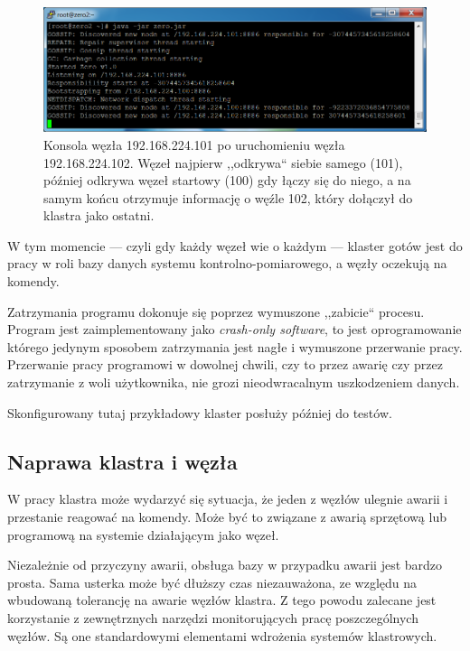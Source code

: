 \documentclass[a4paper,polish,12pt,twoside]{article}
\begin{document}
	\begin{figure}[h]
		\centering \includegraphics[width=15cm]{after_101_start}
		\caption[Zrzut ekranu konsoli węzła]{Konsola węzła 192.168.224.101 po uruchomieniu węzła 192.168.224.102. Węzeł najpierw ,,odkrywa`` siebie samego (101), później odkrywa węzeł startowy (100) gdy łączy się do niego, a na samym końcu otrzymuje informację o węźle 102, który dołączył do klastra jako ostatni.}
		\label{fig:after_101_start}
	\end{figure}

W tym momencie --- czyli gdy każdy węzeł wie o każdym --- klaster gotów jest do pracy w roli bazy danych systemu kontrolno-pomiarowego, a węzły oczekują na komendy.

Zatrzymania programu dokonuje się poprzez wymuszone ,,zabicie`` procesu. Program jest zaimplementowany jako \textit{crash-only software}\cite{Candea:2003}, to jest oprogramowanie którego jedynym sposobem zatrzymania jest nagłe i wymuszone przerwanie pracy. Przerwanie pracy programowi w dowolnej chwili, czy to przez awarię czy przez zatrzymanie z woli użytkownika, nie grozi nieodwracalnym uszkodzeniem danych.

Skonfigurowany tutaj przykładowy klaster posłuży później do testów.

	\subsection{Naprawa klastra i węzła} \label{sec:cluster_repair}
W pracy klastra może wydarzyć się sytuacja, że jeden z węzłów ulegnie awarii i przestanie reagować na komendy. Może być to związane z awarią sprzętową lub programową na systemie działającym jako węzeł.

Niezależnie od przyczyny awarii, obsługa bazy w przypadku awarii jest bardzo prosta. Sama usterka może być dłuższy czas niezauważona, ze względu na wbudowaną tolerancję na awarie węzłów klastra. Z tego powodu zalecane jest korzystanie z zewnętrznych narzędzi monitorujących pracę poszczególnych węzłów. Są one standardowymi elementami wdrożenia systemów klastrowych.
\end{document}
